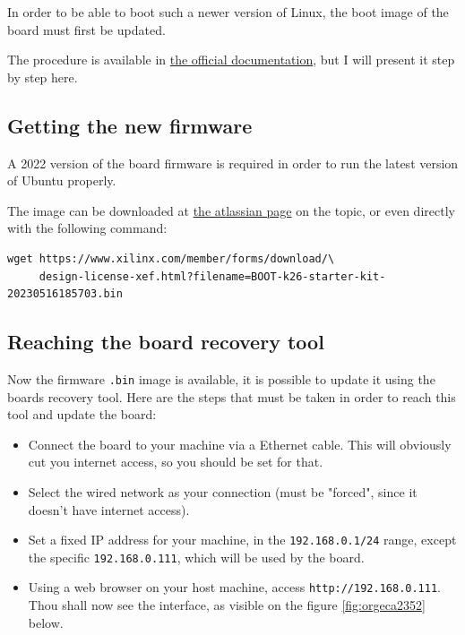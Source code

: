 \documentclass[10pt]{article}
\begin{document}
In order to be able to boot such a newer version of Linux, the
boot image of the board must first be updated.

The procedure is available in \href{https://docs.xilinx.com/r/en-US/ug1089-kv260-starter-kit/Firmware-Update}{the official documentation},
but I will present it step by step here.

\subsection{Getting the new firmware}
\label{sec:org8f6ba68}
A 2022 version of the board firmware is required in order to run the latest
version of Ubuntu properly.

The image can be downloaded at \href{https://xilinx-wiki.atlassian.net/wiki/spaces/A/pages/1641152513/Kria+K26+ SOMoot-FW-update-with-xmutil}{the atlassian page} on the topic,
or even directly with the following command:

\begin{verbatim}
wget https://www.xilinx.com/member/forms/download/\
     design-license-xef.html?filename=BOOT-k26-starter-kit-20230516185703.bin
\end{verbatim}


\subsection{Reaching the board recovery tool}
\label{sec:org10f2aaf}
Now the firmware \texttt{.bin} image is available, it is possible to update it using the
boards recovery tool. Here are the steps that must be taken in order to reach
this tool and update the board:

\begin{itemize}
\item Connect the board to your machine via a Ethernet cable.
This will obviously cut you internet access, so you should be set for that.
\item Select the wired network as your connection (must be "forced", since it
doesn't have internet access).
\item Set a fixed IP address for your machine, in the \texttt{192.168.0.1/24}
range, except the specific \texttt{192.168.0.111}, which will be used by the
board.
\item Using a web browser on your host machine, access
\texttt{http://192.168.0.111}. Thou shall now see the interface, as visible on
the figure \ref{fig:orgeca2352} below.
\end{itemize}
\end{document}
